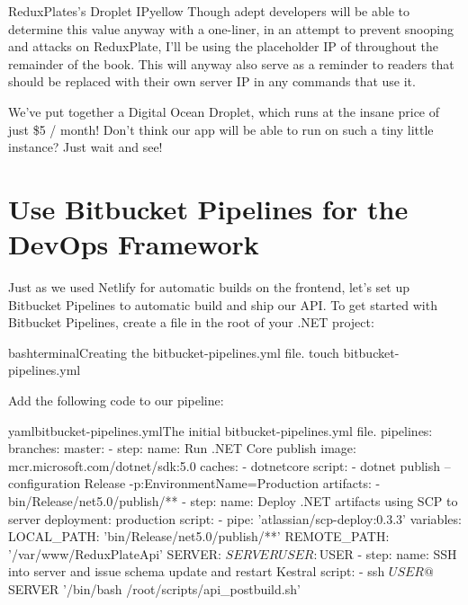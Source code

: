 \documentclass[paper=6in:9in,pagesize=pdftex,headinclude=on,footinclude=on,12pt,twoside]{scrbook}
\begin{document}
\begin{highlightBox}{ReduxPlates's Droplet IP}{yellow}{\warning}
Though adept developers will be able to determine this value anyway with a one-liner, in an attempt to prevent snooping and attacks on ReduxPlate, I'll be using the placeholder IP of  throughout the remainder of the book. This will anyway also serve as a reminder to readers that  should be replaced with their own server IP in any commands that use it.
\end{highlightBox}


We've put together a Digital Ocean Droplet, which runs at the insane price of just \$5 / month! Don't think our app will be able to run on such a tiny little instance? Just wait and see!

\section{Use Bitbucket Pipelines for the DevOps Framework}

Just as we used Netlify for automatic builds on the frontend, let's set up Bitbucket Pipelines to automatic build and ship our API. To get started with Bitbucket Pipelines, create a  file in the root of your .NET project:

\begin{codeInput}{bash}{terminal}{Creating the bitbucket-pipelines.yml file.}
touch bitbucket-pipelines.yml  
\end{codeInput}

Add the following code to our pipeline:

\begin{codeInput}{yaml}{bitbucket-pipelines.yml}{The initial bitbucket-pipelines.yml file.}
pipelines:
  branches:
    master:
        - step:
            name: Run .NET Core publish
            image: mcr.microsoft.com/dotnet/sdk:5.0
            caches:
                - dotnetcore
            script:
                - dotnet publish --configuration Release -p:EnvironmentName=Production
            artifacts:
                - bin/Release/net5.0/publish/**
        - step:
            name: Deploy .NET artifacts using SCP to server
            deployment: production
            script:
                - pipe: 'atlassian/scp-deploy:0.3.3'
                  variables:
                    LOCAL_PATH: 'bin/Release/net5.0/publish/**'
                    REMOTE_PATH: '/var/www/ReduxPlateApi'
                    SERVER: $SERVER
                    USER: $USER
        - step:
            name: SSH into server and issue schema update and restart Kestral
            script:
                - ssh $USER@$SERVER '/bin/bash /root/scripts/api_postbuild.sh' 
\end{codeInput}
\end{document}
